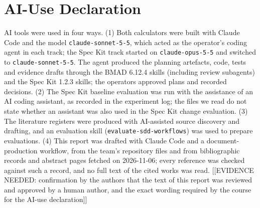 \documentclass[conference]{IEEEtran}
\begin{document}
\section{AI-Use Declaration}\label{ai-use-declaration}

AI tools were used in four ways. (1) Both calculators were built with
Claude Code and the model \texttt{claude-sonnet-5-5}, which acted as the
operator's coding agent in each track; the Spec Kit track started on
\texttt{claude-opus-5-5} and switched to \texttt{claude-sonnet-5-5}. The
agent produced the planning artefacts, code, tests and evidence drafts
through the BMAD 6.12.4 skills (including review subagents) and the Spec
Kit 1.2.3 skills; the operators approved plans and recorded decisions.
(2) The Spec Kit baseline evaluation was run with the assistance of an
AI coding assistant, as recorded in the experiment log; the files we
read do not state whether an assistant was also used in the Spec Kit
change evaluation. (3) The literature registers were produced with
AI-assisted source discovery and drafting, and an evaluation skill
(\texttt{evaluate-sdd-workflows}) was used to prepare evaluations. (4)
This report was drafted with Claude Code and a document-production
workflow, from the team's repository files and from bibliographic
records and abstract pages fetched on 2026-11-06; every reference was
checked against such a record, and no full text of the cited works was
read. {[}{[}EVIDENCE NEEDED: confirmation by the authors that the text
of this report was reviewed and approved by a human author, and the
exact wording required by the course for the AI-use declaration{]}{]}



\end{document}
